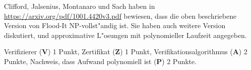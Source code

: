 \begin{diskussion}
Clifford, Jalsenius, Montanaro und Sach haben in
\url{https://arxiv.org/pdf/1001.4420v3.pdf} bewiesen, dass die oben
beschriebene Version von Flood-It NP-vollst"andig ist.
Sie haben auch weitere Version diskutiert, und approximative L"osungen
mit polynomieller Laufzeit angegeben.
\end{diskussion}

\begin{bewertung}
Verifizierer ({\bf V}) 1 Punkt,
Zertifikat ({\bf Z}) 1 Punkt,
Verifikationsalgorithmus ({\bf A}) 2 Punkte,
Nachweis, dass Aufwand polynomiell ist ({\bf P}) 2 Punkte.
\end{bewertung}

